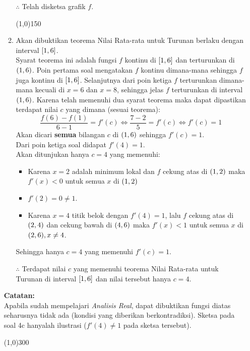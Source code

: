 \begin{enumerate}[leftmargin=*, label={\arabic*}.]
\begin{enumerate}[label={\alph*}.]
    $\therefore$ Telah disketsa grafik $f$.
\begin{center}
    \line(1,0){150}
\end{center}
    \item Akan dibuktikan teorema Nilai Rata-rata untuk Turunan berlaku dengan interval $\cic*{1,6}$.\\
    Syarat teorema ini adalah fungsi $f$ kontinu di $\cic*{1,6}$ dan terturunkan di $\oio*{1,6}$. 
    Poin pertama soal mengatakan $f$ kontinu dimana-mana sehingga $f$ juga kontinu di $\cic*{1,6}$. 
    Selanjutnya dari poin ketiga $f$ terturunkan dimana-mana kecuali di $x=6$ dan $x=8$, sehingga 
    jelas $f$ terturunkan di interval $\oio*{1,6}$. Karena telah memenuhi dua syarat teorema 
    maka dapat dipastikan terdapat nilai $c$ yang dimana (sesuai teorema):
    \[
    \frac{f(6)-f(1)}{6-1} = f'(c) \iff \frac{7-2}{5} = f'(c) \iff f'(c) = 1
    \]
    Akan dicari \textbf{semua} bilangan $c$ di $\oio*{1,6}$ sehingga $f'(c)=1$. \\Dari poin ketiga 
    soal didapat $f'(4)=1$.\\
    Akan ditunjukan hanya $c=4$ yang memenuhi:
    \begin{itemize}
        \item Karena $x=2$ adalah minimum lokal dan $f$ cekung atas di $\oio*{1,2}$ 
        maka $f'(x) < 0$ untuk semua $x$ di $\oio*{1,2}$
        \item $f'(2)=0 \neq 1$.
        \item Karena $x=4$ titik belok dengan $f'(4)=1$, lalu $f$ cekung atas di $\oio*{2,4}$ dan cekung bawah 
        di $\oio*{4,6}$ maka $f'(x) < 1$ untuk semua $x$ di $\oio*{2,6}, x\neq 4$.
    \end{itemize}
    Sehingga hanya $c=4$ yang memenuhi $f'(c)=1$.
    
    $\therefore$ Terdapat nilai $c$ yang memenuhi teorema Nilai Rata-rata untuk Turunan di interval $\cic*{1,6}$ 
    dan nilai tersebut hanya $c=4$.
\end{enumerate}

\vspace{0.1cm}
\textbf{Catatan:}\\
Apabila sudah mempelajari \textit{Analisis Real}, dapat dibuktikan fungsi diatas seharusnya tidak 
ada (kondisi yang diberikan berkontradiksi). Sketsa pada soal 4c hanyalah ilustrasi 
($f'(4)\neq 1$ pada sketsa tersebut).
\begin{center}
    \line(1,0){300}
\end{center}


\end{enumerate}

